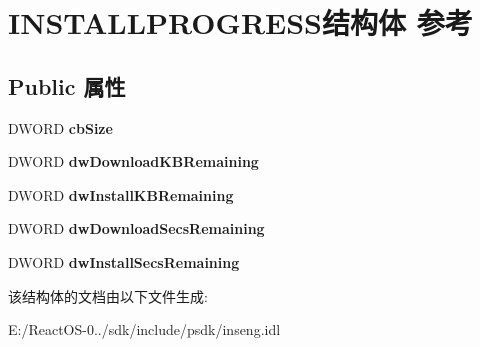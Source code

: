 \hypertarget{struct_i_n_s_t_a_l_l_p_r_o_g_r_e_s_s}{}\section{I\+N\+S\+T\+A\+L\+L\+P\+R\+O\+G\+R\+E\+S\+S结构体 参考}
\label{struct_i_n_s_t_a_l_l_p_r_o_g_r_e_s_s}
\subsection*{Public 属性}
\begin{DoxyCompactItemize}
\item 
\mbox{\label{struct_i_n_s_t_a_l_l_p_r_o_g_r_e_s_s_ad7aa838cb3247892a7ff212f208397cf}} 
D\+W\+O\+RD {\bfseries cb\+Size}
\item 
\mbox{\label{struct_i_n_s_t_a_l_l_p_r_o_g_r_e_s_s_a76e633d27f8f1df522ad28de638011a9}} 
D\+W\+O\+RD {\bfseries dw\+Download\+K\+B\+Remaining}
\item 
\mbox{\label{struct_i_n_s_t_a_l_l_p_r_o_g_r_e_s_s_aba37f172432207efc7faf2df63687439}} 
D\+W\+O\+RD {\bfseries dw\+Install\+K\+B\+Remaining}
\item 
\mbox{\label{struct_i_n_s_t_a_l_l_p_r_o_g_r_e_s_s_a3ec5be74af6f5fa3553b27e1faa461d0}} 
D\+W\+O\+RD {\bfseries dw\+Download\+Secs\+Remaining}
\item 
\mbox{\label{struct_i_n_s_t_a_l_l_p_r_o_g_r_e_s_s_adbdf67024ff684185bb4575736998917}} 
D\+W\+O\+RD {\bfseries dw\+Install\+Secs\+Remaining}
\end{DoxyCompactItemize}


该结构体的文档由以下文件生成\+:\begin{DoxyCompactItemize}
\item 
E\+:/\+React\+O\+S-\/0../sdk/include/psdk/inseng.\+idl\end{DoxyCompactItemize}

